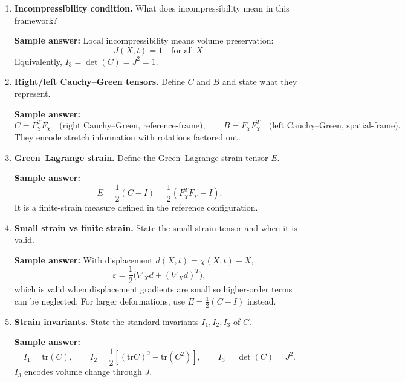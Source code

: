 \documentclass[12pt]{article}
\begin{document}
\begin{enumerate}
\textbf{Sample answer:}
\[
F_\chi=
\begin{pmatrix}
1&\gamma&0\\
0&1&0\\
0&0&1
\end{pmatrix},
\qquad
J=\det(F_\chi)=1.
\]
So simple shear is volume-preserving.

\item \textbf{Incompressibility condition.}
What does incompressibility mean in this framework?

\textbf{Sample answer:}
Local incompressibility means volume preservation:
\[
J(X,t)=1\quad \text{for all } X.
\]
Equivalently, $I_3=\det(C)=J^2=1$.

\item \textbf{Right/left Cauchy--Green tensors.}
Define $C$ and $B$ and state what they represent.

\textbf{Sample answer:}
\[
C = F_\chi^T F_\chi \quad \text{(right Cauchy--Green, reference-frame)},
\qquad
B = F_\chi F_\chi^T \quad \text{(left Cauchy--Green, spatial-frame)}.
\]
They encode stretch information with rotations factored out.

\item \textbf{Green--Lagrange strain.}
Define the Green--Lagrange strain tensor $E$.

\textbf{Sample answer:}
\[
E=\frac12(C-I)=\frac12(F_\chi^T F_\chi - I).
\]
It is a finite-strain measure defined in the reference configuration.

\item \textbf{Small strain vs finite strain.}
State the small-strain tensor and when it is valid.

\textbf{Sample answer:}
With displacement $d(X,t)=\chi(X,t)-X$,
\[
\varepsilon=\frac12\bigl(\nabla_X d + (\nabla_X d)^T\bigr),
\]
which is valid when displacement gradients are small so higher-order terms can be neglected.
For larger deformations, use $E=\tfrac12(C-I)$ instead.

\item \textbf{Strain invariants.}
State the standard invariants $I_1,I_2,I_3$ of $C$.

\textbf{Sample answer:}
\[
I_1=\mathrm{tr}(C),\qquad
I_2=\frac12\left[(\mathrm{tr}C)^2-\mathrm{tr}(C^2)\right],\qquad
I_3=\det(C)=J^2.
\]
$I_3$ encodes volume change through $J$.


\end{enumerate}
\end{document}

